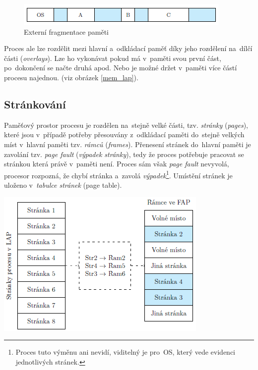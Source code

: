 \begin{figure}[ht]
	\centering
	\includegraphics[scale=1]{images/mem_fragmentace.png}
	\caption{Externí fragmentace paměti}
	\label{mem_fragmentace}
\end{figure}

Proces ale lze rozdělit mezi hlavní a~odkládací paměť díky jeho rozdělení na~dílčí části (\emph{overlays}). Lze ho vykonávat pokud má v~paměti svou první část, po~dokončení se načte druhá apod. Nebo je možné držet v~paměti více částí procesu najednou. (viz obrázek \ref{mem_lap}).

\subsection{Stránkování}

Paměťový prostor procesu je rozdělen na~stejně velké části, tzv. \emph{stránky} (\emph{pages}), které jsou v~případě potřeby přesouvány z~odkládací paměti do~stejně velkých míst v~hlavní paměti tzv. \emph{rámců} (\emph{frames}). Přenesení stránek do~hlavní paměti je zavolání tzv. \emph{page fault} (\emph{výpadek stránky}), tedy že proces potřebuje pracovat se stránkou která právě v~paměti není. Proces sám však \emph{page fault} nevyvolá, procesor rozpozná, že chybí stránka a~zavolá \emph{výpadek}\footnote{Proces tuto výměnu ani nevidí, viditelný je pro~OS, který vede evidenci jednotlivých stránek.}. Umístění stránek je uloženo v~\emph{tabulce stránek} (page table).

\begin{center}
	\includegraphics[scale=1]{images/mem_page_table.png}
	\caption{Stránkování paměti}
\end{center}


